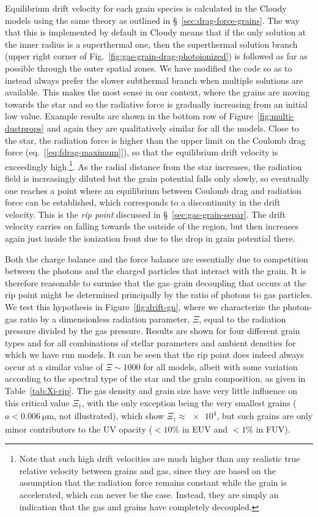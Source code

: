 Equilibrium drift velocity for each grain species is calculated in the
Cloudy models using the same theory \citep{Draine:1979a} as outlined
in \S~\ref{sec:drag-force-grains}.  The way that this is implemented
by default in Cloudy means that if the only solution at the inner
radius is a superthermal one, then the superthermal solution branch
(upper right corner of Fig.~\ref{fig:gas-grain-drag-photoionized}) is
followed as far as possible through the outer spatial zones.  We have
modified the code so as to instead always prefer the slower subthermal
branch when multiple solutions are available.  This makes the most
sense in our context, where the grains are moving towards the star and
so the radiative force is gradually increasing from an initial low
value.  Example results are shown in the bottom row of
Figure~\ref{fig:multi-dustprops} and again they are qualitatively
similar for all the models.  Close to the star, the radiation force is
higher than the upper limit on the Coulomb drag force
(eq.~[\ref{eq:fdrag-maximum}]), so that the equilibrium drift velocity
is exceedingly high.\footnote{Note that such high drift velocities are
  much higher than any realistic true relative velocity between grains
  and gas, since they are based on the assumption that the radiation
  force remains constant while the grain is accelerated, which can
  never be the case.  Instead, they are simply an indication that the
  gas and grains have completely decoupled.}.  As the radial distance
from the star increases, the radiation field is increasingly diluted
but the grain potential falls only slowly, so eventually one reaches a
point where an equilibrium between Coulomb drag and radiation force
can be established, which corresponds to a discontinuity in the drift
velocity.  This is the \textit{rip point} discussed in
\S~\ref{sec:gas-grain-separ}.  The drift velocity carries on falling
towards the outside of the \hii{} region, but then increases again
just inside the ionization front due to the drop in grain potential
there.

Both the charge balance and the force balance are essentially due to
competition between the photons and the charged particles that
interact with the grain.  It is therefore reasonable to surmise that
the gas--grain decoupling that occurs at the rip point might be
determined principally by the ratio of photons to gas particles.  We
test this hypothesis in Figure~\ref{fig:drift-gn}, where we
characterize the photon-gas ratio by a dimensionless radiation
parameter, \(\Xi\), equal to the radiation pressure divided by the gas
pressure.  Results are shown for four different grain types and for
all combinations of stellar parameters and ambient densities for which
we have run models.  It can be seen that the rip point does indeed
always occur at a similar value of \(\Xi \sim 1000\) for all models, albeit
with some variation according to the spectral type of the star and the
grain composition, as given in Table~\ref{tab:Xi-rip}.  The gas
density and grain size have very little influence on this critical
value \(\Xi_\dag\), with the only exception being the very smallest grains
(\(a < \SI{0.006}{\um}\), not illustrated), which show
\(\Xi_\dag \approx \num{e4}\), but such grains are only minor contributors to the
UV opacity (\(< 10\%\) in EUV and \(< 1\%\) in FUV).

